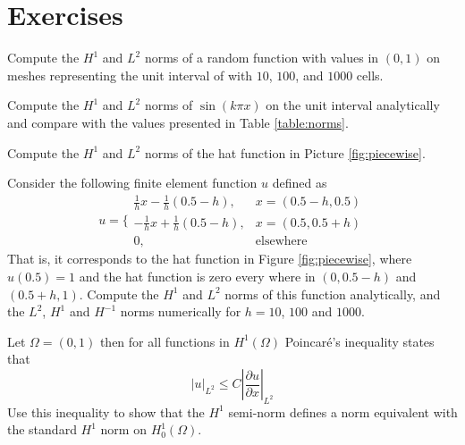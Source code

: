 \section{Exercises}

\begin{exercise}
Compute the $H^1$ and $L^2$ norms of a random function with values
in $(0,1)$ on meshes representing the unit interval of with $10$, $100$, and $1000$ cells.   
\end{exercise}

\begin{exercise}
Compute the $H^1$ and $L^2$ norms of  $\sin( k \pi x)$ on the unit interval analytically 
and compare with the values presented in Table \ref{table:norms}.   
\end{exercise}

\begin{exercise}
\label{ex:piecewise}
Compute the $H^1$ and $L^2$ norms of  the hat function in Picture \ref{fig:piecewise}.   
\end{exercise}



\begin{exercise}
\label{ex:hat2}
Consider the following finite element function $u$ defined
as  
\[
u = \Bigg\{ 
\begin{array}{ll} \frac{1}{h} x - \frac{1}{h} (0.5 - h), & x=(0.5-h,0.5) \\  
              -\frac{1}{h} x + \frac{1}{h} (0.5 - h),  & x=(0.5,0.5 + h) \\  
                0, & \mbox{elsewhere}  
\end{array}
\]
That is, it corresponds to the hat function in Figure \ref{fig:piecewise}, where
$u(0.5)=1$ and the hat function is zero every where in $(0,0.5-h)$ and  $(0.5+h, 1)$.  
Compute the $H^1$ and $L^2$ norms of this function analytically, and the 
$L^2$, $H^1$ and $H^{-1}$ norms numerically for $h=10$, $100$ and $1000$.    
\end{exercise}
\begin{exercise}
\label{ex:poincare}

Let $\Omega=(0,1)$ then  
for all functions in $H^1(\Omega)$
Poincar\'e's inequality states that
\[
|u|_{L^2} \le C  |\frac{\partial u}{\partial x}|_{L^2}   
\]
Use this inequality to show that the $H^1$ semi-norm defines 
a norm equivalent with the standard $H^1$ norm on $H^1_0(\Omega)$. 
\end{exercise}







